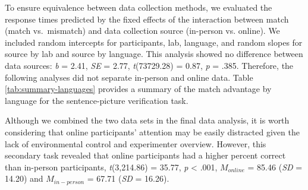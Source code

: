 \documentclass[
  man,floatsintext]{apa7}
\begin{document}
To ensure equivalence between data collection methods, we evaluated the
response times predicted by the fixed effects of the interaction between
match (match vs.~mismatch) and data collection source (in-person vs.
online). We included random intercepts for participants, lab, language,
and random slopes for source by lab and source by language. This
analysis showed no difference between data sources: \emph{b} =
2.41,
\emph{SE} =
2.77,
\emph{t}(73729.28)
=
0.87,
\emph{p} = .385. Therefore, the
following analyses did not separate in-person and online data. Table
\ref{tab:summary-languages} provides a summary of the match advantage
by language for the sentence-picture verification task.

Although we combined the two data sets in the final data analysis, it is
worth considering that online participants' attention may be easily
distracted given the lack of environmental control and experimenter
overview. However, this secondary task revealed that online participants
had a higher percent correct than in-person participants,
\emph{t}(3,214.86) = 35.77, \emph{p}
\textless{} .001, \(M_{online}\) =
85.46
(\emph{SD} =
14.20)
and \(M_{in-person}\) =
67.71
(\emph{SD} =
16.26).
\end{document}
